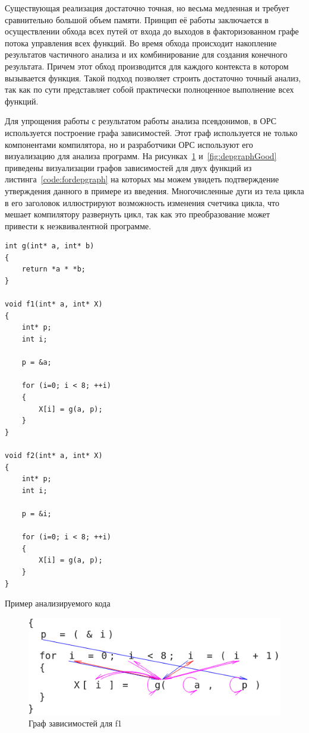 Существующая реализация достаточно точная, но весьма медленная и требует сравнительно большой объем памяти. Принцип её работы заключается в осуществлении обхода всех путей от входа до выходов в факторизованном графе потока управления всех функций. Во время обхода происходит накопление результатов частичного анализа и их комбинирование для создания конечного результата. Причем этот обход производится для каждого контекста в котором вызывается функция. Такой подход позволяет строить достаточно точный анализ, так как по сути представляет собой практически полноценное выполнение всех функций.

Для упрощения работы с результатом работы анализа псевдонимов, в ОРС используется построение графа зависимостей. Этот граф используется не только компонентами компилятора, но и разработчики ОРС используют его визуализацию для анализа программ. На рисунках~\ref{fig:depgraphBad} и~\ref{fig:depgraphGood} приведены визуализации графов зависимостей для двух функций из листинга~\ref{code:fordepgraph} на которых мы можем увидеть подтверждение утверждения данного в примере из введения. Многочисленные дуги из тела цикла в его заголовок иллюстрируют возможность изменения счетчика цикла, что мешает компилятору развернуть цикл, так как это преобразование может привести к неэквивалентной программе.

\begin{ListingEnv}[H]
\begin{lstlisting}
int g(int* a, int* b)
{
    return *a * *b;
}

void f1(int* a, int* X)
{
    int* p;
    int i;
    
    p = &a;

    for (i=0; i < 8; ++i)
    {
        X[i] = g(a, p);
    }
}

void f2(int* a, int* X)
{
    int* p;
    int i;
    
    p = &i;

    for (i=0; i < 8; ++i)
    {
        X[i] = g(a, p);
    }
}
\end{lstlisting}
\caption{Пример анализируемого кода}
\label{code:fordepgraph}
\end{ListingEnv}

\begin{figure}[H]
\centering
\includegraphics[width=1\textwidth]{img/opsDepGraphBad_alpha.png}
\caption{Граф зависимостей для f1}
\label{fig:depgraphBad}
\end{figure}

